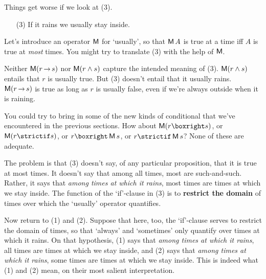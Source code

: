 Things get worse if we look at (3).
\begin{enumerate}[leftmargin=10mm]
  \item[(3)] If it rains we usually stay inside.
\end{enumerate}
Let's introduce an operator $\operatorname{\mathsf{M}}$ for `usually', so that $\operatorname{\mathsf{M}} A$ is true
at a time iff $A$ is true at \emph{most} times. You might try to translate (3)
with the help of $\operatorname{\mathsf{M}}$.

Neither $\Mostly(r \to s)$ nor $\operatorname{\mathsf{M}}(r \land s)$ capture the intended meaning
of (3). $\operatorname{\mathsf{M}}(r \land s)$ entails that $r$ is usually true. But (3) doesn't
entail that it usually rains. $\Mostly(r \to s)$ is true as long as $r$ is
usually false, even if we're always outside when it is raining.

You could try to bring in some of the new kinds of conditional that we've
encountered in the previous sections. How about $\Mostly(r \boxright s)$, or
$\Mostly(r \strictif s)$, or $r \boxright \Mostly s$, or
$r \strictif \Mostly s$? None of these are adequate.

The problem is that (3) doesn't say, of any particular proposition, that it is
true at most times. It doesn't say that among all times, most are such-and-such.
Rather, it says that \emph{among times at which it rains}, most times are times
at which we stay inside. The function of the `if'-clause in (3) is to
\textbf{restrict the domain} of times over which the `usually' operator
quantifies.



Now return to (1) and (2). Suppose that here, too, the `if'-clause serves to
restrict the domain of times, so that `always' and `sometimes' only quantify
over times at which it rains. On that hypothesis, (1) says that \emph{among
  times at which it rains}, all times are times at which we stay inside, and (2)
says that \emph{among times at which it rains}, some times are times at which we
stay inside. This is indeed what (1) and (2) mean, on their most salient
interpretation.

